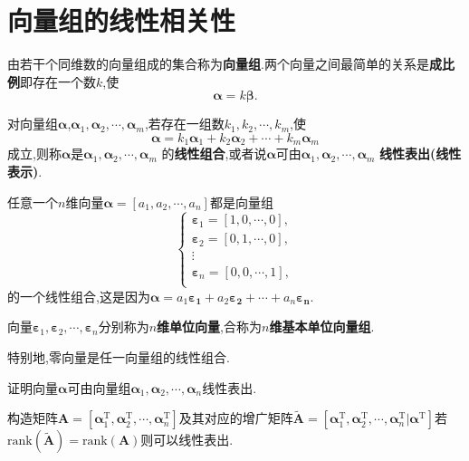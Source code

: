 \documentclass[9pt,a4paper]{book}
\begin{document}
\section{向量组的线性相关性}
\begin{defination}[向量组]
	由若干个同维数的向量组成的集合称为\textbf{向量组}.两个向量之间最简单的关系是\textbf{成比例}即存在一个数$ k $,使\[ \bm{\alpha}=k\bm{\beta}. \]
\end{defination}
\begin{defination}
	对向量组$ \bm{\alpha} $,$ \bm{\alpha}_1,\bm{\alpha}_2,\cdots,\bm{\alpha}_m $,若存在一组数$ k_1,k_2,\cdots,k_m $,使\[ \bm{\alpha}=k_1\bm{\alpha}_1+k_2\bm{\alpha}_2+\cdots+k_m\bm{\alpha}_m \]
	成立,则称$ \bm{\alpha} $是$ \bm{\alpha}_1,\bm{\alpha}_2,\cdots,\bm{\alpha}_m $
	的\textbf{线性组合},或者说$ \bm{\alpha} $可由$ \bm{\alpha}_1,\bm{\alpha}_2,\cdots,\bm{\alpha}_m $
	\textbf{线性表出(线性表示)}.
	
	任意一个$ n $维向量$ \bm{\alpha}=[a_1,a_2,\cdots,a_n] $都是向量组\[ \left\lbrace \begin{array}{c}
	\bm{\varepsilon}_1=[1,0,\cdots,0],\\
	\bm{\varepsilon}_2=[0,1,\cdots,0],\\
	\vdots\\
	\bm{\varepsilon}_n=[0,0,\cdots,1],\\
	\end{array} \right. \]的一个线性组合,这是因为$ \bm{\alpha}=a_1\bm{\varepsilon_1}+a_2\bm{\varepsilon_2}+\cdots+a_n\bm{\varepsilon_n} $.
	
	向量$ \bm{\varepsilon}_1,\bm{\varepsilon}_2,\cdots,\bm{\varepsilon}_n $分别称为\textbf{$ n $维单位向量},合称为\textbf{$ n $维基本单位向量组}.
	
	特别地,零向量是任一向量组的线性组合.
\end{defination}
\begin{example}
	证明向量$ \bm{\alpha} $可由向量组$ \bm{\alpha}_1,\bm{\alpha}_2,\cdots,\bm{\alpha}_n $线性表出.
	
	构造矩阵$ \bm{A}=[\bm{\alpha}_1^\mathrm{T},\bm{\alpha}_2^\mathrm{T},\cdots,\bm{\alpha}_n^\mathrm{T}] $及其对应的增广矩阵$ \widetilde{\bm{A}}=[\bm{\alpha}_1^\mathrm{T},\bm{\alpha}_2^\mathrm{T},\cdots,\bm{\alpha}_n^\mathrm{T}|\bm{\alpha}^\mathrm{T}] $若$ \mathrm{rank}(\widetilde{\bm{A}})=\mathrm{rank}(\bm{A}) $则可以线性表出.
\end{example}
\end{document}
